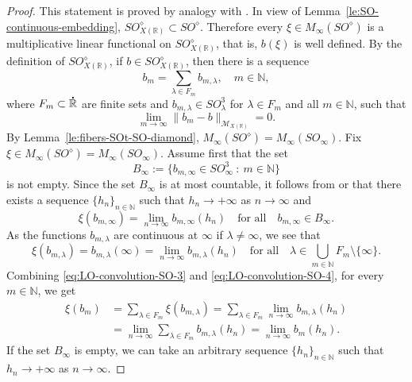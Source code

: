 \documentclass{birkjour}
\numberwithin{equation}{section}
\newcommand{\N}{\mathbb{N}}
\newcommand{\R}{\mathbb{R}}
\newcommand{\cM}{\mathcal{M}}
\newcommand{\dR}{{\bf\dot{\R}}}
\begin{document}
\begin{proof}
This statement is proved by analogy with \cite[Lemma~5.1]{KILH13a}.
In view of Lemma~\ref{le:SO-continuous-embedding},
$SO_{X(\R)}^\diamond\subset SO^\diamond$. Therefore every
$\xi\in M_\infty(SO^\diamond)$ is a multiplicative linear functional
on $SO_{X(\R)}^\diamond$, that is, $b(\xi)$ is well defined. By the definition
of $SO_{X(\R)}^\diamond$, if $b\in SO_{X(\R)}^\diamond$, then there is a
sequence
\[
b_m=\sum_{\lambda\in F_m}b_{m,\lambda},\quad m\in\N,
\]
where $F_m\subset\dR$ are finite sets and $b_{m,\lambda}\in SO_\lambda^3$
for $\lambda\in F_m$ and all $m\in\N$, such that
\begin{equation}\label{eq:LO-convolution-SO-2}
\lim_{m\to\infty}\|b_m-b\|_{\cM_{X(\R)}}=0.
\end{equation}
By Lemma~\ref{le:fibers-SOt-SO-diamond},
$M_\infty(SO^\diamond)=M_\infty(SO_\infty)$. Fix
$\xi\in M_\infty(SO^\diamond)=M_\infty(SO_\infty)$. Assume first that the set
\[
B_\infty:=\{b_{m,\infty}\in SO_\infty^3\ :\ m\in\N\}
\]
is not empty. Since the set $B_\infty$ is at most countable, it follows from
\cite[Corollary~3.3]{BBK04} or \cite[Proposition~3.1]{KILH13a} that there
exists a sequence $\{h_n\}_{n\in\N}$ such that $h_n\to+\infty$ as $n\to\infty$
and
\begin{equation}\label{eq:LO-convolution-SO-3}
\xi(b_{m,\infty})=\lim_{n\to\infty} b_{m,\infty}(h_n)
\quad\mbox{for all}\quad b_{m,\infty}\in B_\infty.
\end{equation}
As the functions $b_{m,\lambda}$ are continuous at $\infty$ if
$\lambda\ne\infty$, we see that
\begin{equation}\label{eq:LO-convolution-SO-4}
\xi(b_{m,\lambda})=b_{m,\lambda}(\infty)=\lim_{n\to\infty} b_{m,\lambda}(h_n)
\quad\mbox{for all}\quad \lambda\in\bigcup_{m\in\N}F_m\setminus\{\infty\}.
\end{equation}
Combining \eqref{eq:LO-convolution-SO-3} and \eqref{eq:LO-convolution-SO-4},
for every $m\in\N$, we get
\begin{align}\label{eq:LO-convolution-SO-5}
\xi(b_m)
&=
\sum_{\lambda\in F_m} \xi(b_{m,\lambda})
=
\sum_{\lambda\in F_m}
\lim_{n\to\infty}b_{m,\lambda}(h_n)
\nonumber\\
&=
\lim_{n\to\infty}\sum_{\lambda\in F_m}b_{m,\lambda}(h_n)
=
\lim_{n\to\infty}b_m(h_n).
\end{align}
If the set $B_\infty$ is empty, we can take an arbitrary sequence
$\{h_n\}_{n\in\N}$ such that $h_n\to+\infty$ as $n\to\infty$.


\end{proof}
\end{document}
